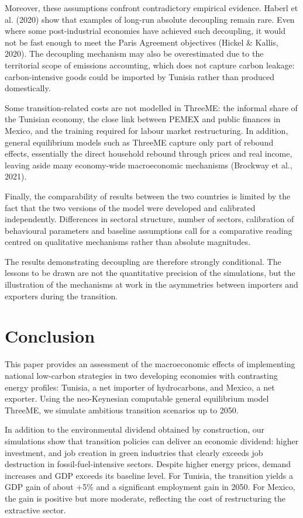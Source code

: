 \documentclass[12pt, a4paper]{article}
\begin{document}
Moreover, these assumptions confront contradictory empirical evidence. Haberl et al. (2020) show that examples of long-run absolute decoupling remain rare. Even where some post-industrial economies have achieved such decoupling, it would not be fast enough to meet the Paris Agreement objectives (Hickel \& Kallis, 2020). The decoupling mechanism may also be overestimated due to the territorial scope of emissions accounting, which does not capture carbon leakage: carbon-intensive goods could be imported by Tunisia rather than produced domestically.

Some transition-related costs are not modelled in ThreeME: the informal share of the Tunisian economy, the close link between PEMEX and public finances in Mexico, and the training required for labour market restructuring. In addition, general equilibrium models such as ThreeME capture only part of rebound effects, essentially the direct household rebound through prices and real income, leaving aside many economy-wide macroeconomic mechanisms (Brockway et al., 2021).

Finally, the comparability of results between the two countries is limited by the fact that the two versions of the model were developed and calibrated independently. Differences in sectoral structure, number of sectors, calibration of behavioural parameters and baseline assumptions call for a comparative reading centred on qualitative mechanisms rather than absolute magnitudes.

The results demonstrating decoupling are therefore strongly conditional. The lessons to be drawn are not the quantitative precision of the simulations, but the illustration of the mechanisms at work in the asymmetries between importers and exporters during the transition.

\section{Conclusion}
\label{sec:conclusion}

This paper provides an assessment of the macroeconomic effects of implementing national low-carbon strategies in two developing economies with contrasting energy profiles: Tunisia, a net importer of hydrocarbons, and Mexico, a net exporter. Using the neo-Keynesian computable general equilibrium model ThreeME, we simulate ambitious transition scenarios up to 2050.

In addition to the environmental dividend obtained by construction, our simulations show that transition policies can deliver an economic dividend: higher investment, and job creation in green industries that clearly exceeds job destruction in fossil-fuel-intensive sectors. Despite higher energy prices, demand increases and GDP exceeds its baseline level. For Tunisia, the transition yields a GDP gain of about +5\% and a significant employment gain in 2050. For Mexico, the gain is positive but more moderate, reflecting the cost of restructuring the extractive sector.
\end{document}
